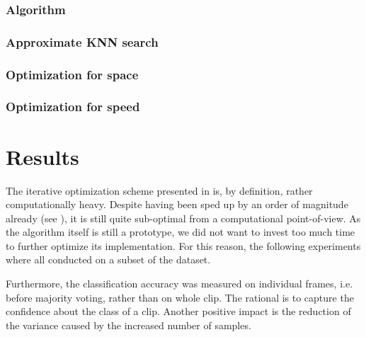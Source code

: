 \subsection{Algorithm}

\subsection{Approximate KNN search}

\subsection{Optimization for space}

\subsection{Optimization for speed}




\chapter{Results} \label{chap:results}

The iterative optimization scheme presented in  is, by definition, rather computationally heavy. Despite having been sped up by an order of magnitude already (see ), it is still quite sub-optimal from a computational point-of-view. As the algorithm itself is still a prototype, we did not want to invest too much time to further optimize its implementation. For this reason, the following experiments where all conducted on a subset of the dataset.

Furthermore, the classification accuracy was measured on individual frames, i.e. before majority voting, rather than on whole clip. The rational is to capture the confidence about the class of a clip. Another positive impact is the reduction of the variance caused by the increased number of samples.

